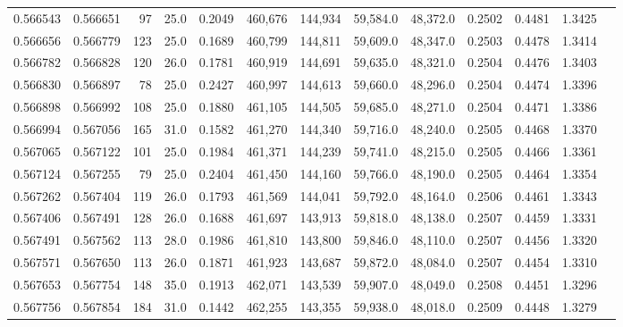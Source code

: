 \begin{tabular}{rrrrrrrrrrrrr}
0.566543 & 0.566651 &    97 & 25.0 &                                     0.2049 & 460,676 & 144,934 &  59,584.0 &  48,372.0 & 0.2502 & 0.4481 & 1.3425 \\
0.566656 & 0.566779 &   123 & 25.0 &                                     0.1689 & 460,799 & 144,811 &  59,609.0 &  48,347.0 & 0.2503 & 0.4478 & 1.3414 \\
0.566782 & 0.566828 &   120 & 26.0 &                                     0.1781 & 460,919 & 144,691 &  59,635.0 &  48,321.0 & 0.2504 & 0.4476 & 1.3403 \\
0.566830 & 0.566897 &    78 & 25.0 &                                     0.2427 & 460,997 & 144,613 &  59,660.0 &  48,296.0 & 0.2504 & 0.4474 & 1.3396 \\
0.566898 & 0.566992 &   108 & 25.0 &                                     0.1880 & 461,105 & 144,505 &  59,685.0 &  48,271.0 & 0.2504 & 0.4471 & 1.3386 \\
0.566994 & 0.567056 &   165 & 31.0 &                                     0.1582 & 461,270 & 144,340 &  59,716.0 &  48,240.0 & 0.2505 & 0.4468 & 1.3370 \\
0.567065 & 0.567122 &   101 & 25.0 &                                     0.1984 & 461,371 & 144,239 &  59,741.0 &  48,215.0 & 0.2505 & 0.4466 & 1.3361 \\
0.567124 & 0.567255 &    79 & 25.0 &                                     0.2404 & 461,450 & 144,160 &  59,766.0 &  48,190.0 & 0.2505 & 0.4464 & 1.3354 \\
0.567262 & 0.567404 &   119 & 26.0 &                                     0.1793 & 461,569 & 144,041 &  59,792.0 &  48,164.0 & 0.2506 & 0.4461 & 1.3343 \\
0.567406 & 0.567491 &   128 & 26.0 &                                     0.1688 & 461,697 & 143,913 &  59,818.0 &  48,138.0 & 0.2507 & 0.4459 & 1.3331 \\
0.567491 & 0.567562 &   113 & 28.0 &                                     0.1986 & 461,810 & 143,800 &  59,846.0 &  48,110.0 & 0.2507 & 0.4456 & 1.3320 \\
0.567571 & 0.567650 &   113 & 26.0 &                                     0.1871 & 461,923 & 143,687 &  59,872.0 &  48,084.0 & 0.2507 & 0.4454 & 1.3310 \\
0.567653 & 0.567754 &   148 & 35.0 &                                     0.1913 & 462,071 & 143,539 &  59,907.0 &  48,049.0 & 0.2508 & 0.4451 & 1.3296 \\
0.567756 & 0.567854 &   184 & 31.0 &                                     0.1442 & 462,255 & 143,355 &  59,938.0 &  48,018.0 & 0.2509 & 0.4448 & 1.3279 \\

\end{tabular}
